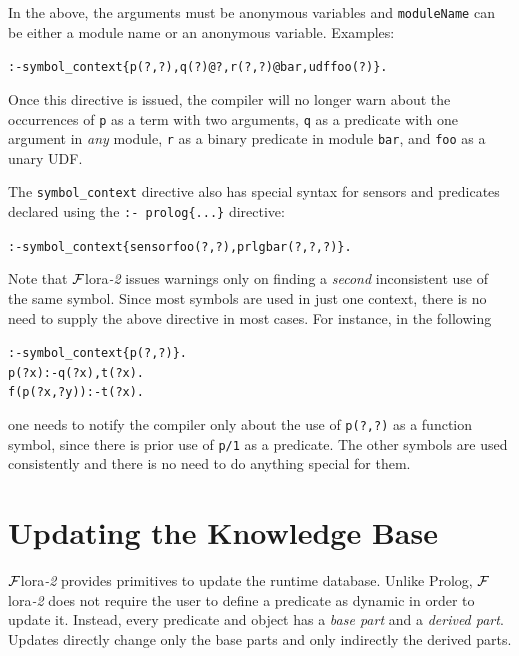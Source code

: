 \documentclass[11pt]{article}
\newcommand{\FLORA}{{\mbox{\sc ${\cal F}${lora}\rm\emph{-2}}}\xspace}
\newcommand{\FLSYSTEM}{\FLORA}
\begin{document}
In the above, the arguments must be anonymous variables
and \texttt{moduleName} can be either a module name or an anonymous variable.
Examples:
\begin{alltt}
    :- symbol_context\{p(?,?), q(?)@?, r(?,?)@bar, udf foo(?)\}.
\end{alltt}
Once this directive is issued, the compiler will no longer warn about the
occurrences of \texttt{p} as a term with two arguments, \texttt{q} as a
predicate with one argument in \emph{any} module, \texttt{r} as a binary
predicate in module \texttt{bar}, and \texttt{foo} as a unary UDF.      

The \texttt{symbol\_context} directive also
has special syntax for sensors and predicates declared using the
\texttt{:- prolog\{...\}} directive:
\begin{alltt}
   :- symbol_context\{sensor foo(?,?), prlg bar(?,?,?)\}.
\end{alltt}

Note that \FLSYSTEM issues warnings only on finding a \emph{second}
inconsistent use of the same symbol. Since most symbols are used in just
one context, there is no need to supply the above directive  
in most cases. For instance, in the following
\begin{alltt}
    :- symbol_context\{p(?,?)\}.
    p(?x):-q(?x), t(?x).
    f(p(?x,?y)):-t(?x).
\end{alltt}
one needs to notify the compiler only about the use of \texttt{p(?,?)} as a
function symbol, since there is prior use of \texttt{p/1} as a predicate.
The other symbols are used consistently and there is no need to do anything
special for them.


\section{Updating the Knowledge Base}\label{sec-updates}


%
\FLSYSTEM provides primitives to update the runtime database. Unlike Prolog,
\FLSYSTEM does not require the user to define a predicate as dynamic in order
to update it. Instead, every predicate and object
has a \emph{base part} and a \emph{derived part}.  Updates directly change
only the base parts and only indirectly the derived parts.
\end{document}
